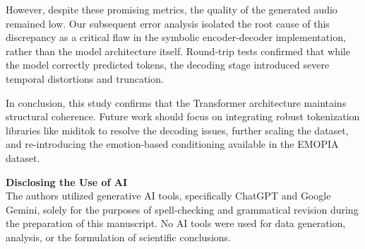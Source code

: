 \documentclass{article}
\begin{document}
However, despite these promising metrics, the quality of the generated audio remained low. Our subsequent error analysis isolated the root cause of this discrepancy as a critical flaw in the symbolic encoder-decoder implementation, rather than the model architecture itself. Round-trip tests confirmed that while the model correctly predicted tokens, the decoding stage introduced severe temporal distortions and truncation.

In conclusion, this study confirms that the Transformer architecture maintains structural coherence. Future work should focus on integrating robust tokenization libraries like miditok to resolve the decoding issues, further scaling the dataset, and re-introducing the emotion-based conditioning available in the EMOPIA dataset.

\vspace{1.0em}
\noindent \textbf{Disclosing the Use of AI} \\
The authors utilized generative AI tools, specifically ChatGPT and Google Gemini, solely for the purposes of spell-checking and grammatical revision during the preparation of this manuscript. No AI tools were used for data generation, analysis, or the formulation of scientific conclusions.



\end{document}
